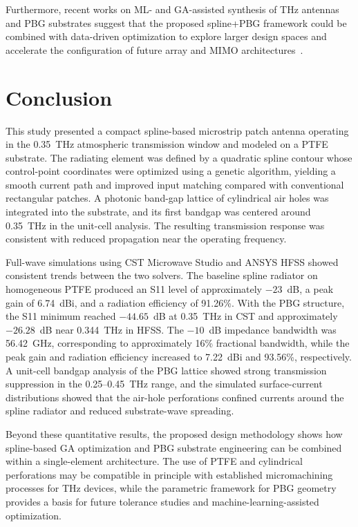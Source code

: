 \documentclass[draft]{agujournal2019}
\begin{document}
Furthermore, recent works on ML- and GA-assisted synthesis of THz antennas and PBG substrates suggest that the proposed spline+PBG framework could be combined with data-driven optimization to explore larger design spaces and accelerate the configuration of future array and MIMO architectures~\cite{babaahmed_hybrid_2025,merino_machine_2025}.


\section{Conclusion}
\label{sec:conclusion}

This study presented a compact spline-based microstrip patch antenna operating in the 0.35~THz atmospheric transmission window and modeled on a PTFE substrate. The radiating element was defined by a quadratic spline contour whose control-point coordinates were optimized using a genetic algorithm, yielding a smooth current path and improved input matching compared with conventional rectangular patches. A photonic band-gap lattice of cylindrical air holes was integrated into the substrate, and its first bandgap was centered around 0.35~THz in the unit-cell analysis. The resulting transmission response was consistent with reduced propagation near the operating frequency.

Full-wave simulations using CST Microwave Studio and ANSYS HFSS showed consistent trends between the two solvers. The baseline spline radiator on homogeneous PTFE produced an S11 level of approximately $-23$~dB, a peak gain of 6.74~dBi, and a radiation efficiency of 91.26\%. With the PBG structure, the S11 minimum reached $-44.65$~dB at 0.35~THz in CST and approximately $-26.28$~dB near 0.344~THz in HFSS. The \(-10\)~dB impedance bandwidth was 56.42~GHz, corresponding to approximately 16\% fractional bandwidth, while the peak gain and radiation efficiency increased to 7.22~dBi and 93.56\%, respectively. A unit-cell bandgap analysis of the PBG lattice showed strong transmission suppression in the 0.25--0.45~THz range, and the simulated surface-current distributions showed that the air-hole perforations confined currents around the spline radiator and reduced substrate-wave spreading.

Beyond these quantitative results, the proposed design methodology shows how spline-based GA optimization and PBG substrate engineering can be combined within a single-element architecture. The use of PTFE and cylindrical perforations may be compatible in principle with established micromachining processes for THz devices, while the parametric framework for PBG geometry provides a basis for future tolerance studies and machine-learning-assisted optimization.
\end{document}
